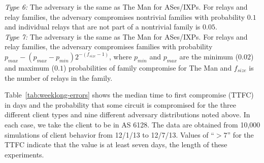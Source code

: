 \documentclass[conference]{styles/IEEEtran}
\begin{document}
\textit{Type 6:} The adversary is the same as \textsf{The Man} for ASes/IXPs.  For relays and relay families, the adversary compromises nontrivial families with probability $0.1$ and individual relays that are not part of a nontrivial family is $0.05$.\\
	\textit{Type 7:} The adversary is the same as \textsf{The Man} for ASes/IXPs.  For relays and relay families, the adversary compromises families with probability $p_{max} - (p_{max} - p_{min}) 2^{-(f_{size} - 1)}$, where $p_{min}$ and $p_{max}$ are the minimum ($0.02$) and maximum ($0.1$) probabilities of family compromise for \textsf{The Man} and $f_{size}$ is the number of relays in the family.

Table~\ref{tab:weeklong-errors} shows the median time to first compromise (TTFC) in days and the probability that some circuit is compromised for the three different client types and nine different adversary distributions noted above.  In each case, we take the client to be in AS 6128.  The data are obtained from 10,000 simulations of client behavior from 12/1/13 to 12/7/13.  Values of ``$>7$'' for the TTFC indicate that the value is at least seven days, the length of these experiments.
\end{document}
